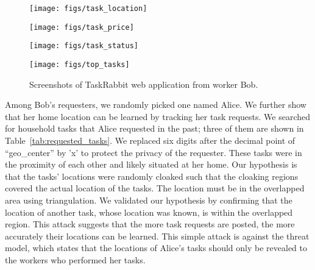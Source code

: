 \documentclass{USC-Thesis}
\numberwithin{equation}{chapter}
\begin{document}
\begin{figure*}[ht]
	\begin{minipage}[b]{.245\linewidth}
		\centering
		\texttt{[image: figs/task\_location]}
		\label{fig:task_location}
	\end{minipage}
		\begin{minipage}[b]{.245\linewidth}
		\centering
		\texttt{[image: figs/task\_price]}
		\label{fig:task_price}
	\end{minipage}
	\begin{minipage}[b]{.245\linewidth}
		\centering
		\texttt{[image: figs/task\_status]}
		\label{fig:task_status}
	\end{minipage}
	\begin{minipage}[b]{.245\linewidth}
		\centering
		\texttt{[image: figs/top\_tasks]}
		\label{fig:top_tasks}
	\end{minipage}
	\caption{Screenshots of TaskRabbit web application from worker Bob.}
	\label{fig:task_info}
\end{figure*}

Among Bob's requesters, we randomly picked one named Alice.
We further show that her home location can be learned by tracking her task requests.
We searched for household tasks that Alice requested in the past; three of them are shown in Table~\ref{tab:requested_tasks}. We replaced six digits after the decimal point of ``geo\_center'' by 'x' to protect the privacy of the requester. These tasks were in the proximity of each other and likely situated at her home. Our hypothesis is that the tasks' locations were randomly cloaked such that the cloaking regions covered the actual location of the tasks.
The location must be in the overlapped area using triangulation. We validated our hypothesis by confirming that the location of another task, whose location was known, is within the overlapped region. This attack suggests that the more task requests are posted, the more accurately their locations can be learned. This simple attack is against the threat model, which states that the locations of Alice's tasks should only be revealed to the workers who performed her tasks.
\end{document}
